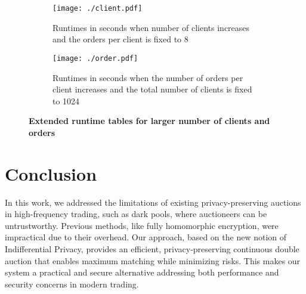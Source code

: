 \begin{figure}[H]
    \centering
    \begin{subfigure}[t]{0.45\textwidth}  
        \centering
        \texttt{[image: ./client.pdf]}  %
        \caption{\textnormal{Runtimes in seconds when number of clients increases and the orders per client is fixed to 8}}
        \label{fig:client}
    \end{subfigure}
    \hspace{1em} %
    \begin{subfigure}[t]{0.45\textwidth}  
        \centering
        \texttt{[image: ./order.pdf]}  %
        \caption{\textnormal{Runtimes in seconds when the number of orders per client increases and the total number of clients is fixed to 1024}}
        \label{fig:order}
    \end{subfigure}
    \vspace{1em} %
    \caption{\textbf{Extended runtime tables for larger number of clients and orders}}
    \label{fig:scalable}
\end{figure}


\section{Conclusion}
In this work, we addressed the limitations of existing privacy-preserving auctions in high-frequency trading, such as dark pools, where auctioneers can be untrustworthy. Previous methods, like fully homomorphic encryption, were impractical due to their overhead. Our approach, based on the new notion of Indifferential Privacy, provides an efficient, privacy-preserving continuous double auction that enables maximum matching while minimizing risks. This makes our system a practical and secure alternative addressing both performance and security concerns in modern trading.



